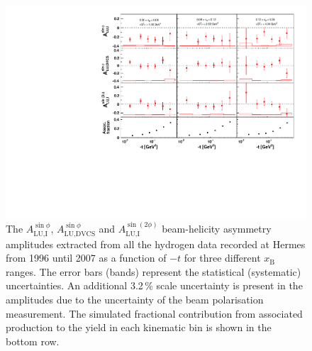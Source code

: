 \documentclass[11pt,a4paper]{article}
\begin{document}
\begin{figure}
 \begin{center}
 \includegraphics[width=15cm]{bsa_2D}
  \caption{The $A_{\textrm{LU,I}}^{\sin\phi}$, $A_{\textrm{LU,DVCS}}^{\sin\phi}$ and
$A_{\textrm{LU,I}}^{\sin(2\phi)}$ beam-helicity asymmetry amplitudes extracted from all the hydrogen data recorded at H{\sc ermes} from 1996 until 2007 as a function of $-t$ for three different $x_{\textrm{B}}$ ranges. The error bars (bands) represent the statistical (systematic) uncertainties. An additional 3.2\,\% scale uncertainty is present in the amplitudes due to the uncertainty of the beam polarisation measurement. The simulated fractional contribution from associated production to the yield in each kinematic bin is shown in the bottom row.}
  \label{bsa_xbjrange2}
 \end{center}
\end{figure}
\end{document}
